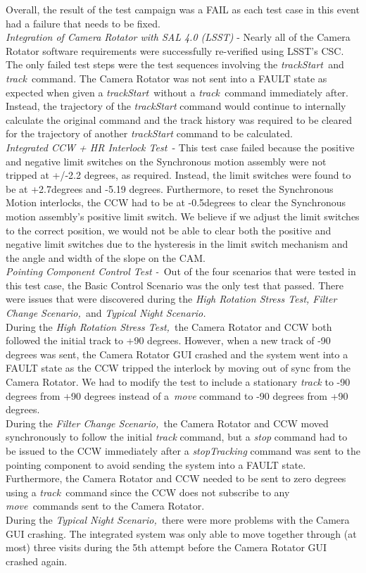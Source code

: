 \documentclass[SE,lsstdraft,STR,toc]{lsstdoc}
\begin{document}
 Overall, the result of the test campaign was a FAIL as each test case in
this event had a failure that needs to be
fixed.\\[2\baselineskip]\emph{Integration of Camera Rotator with SAL 4.0
(LSST)} - Nearly all of the Camera Rotator software requirements were
successfully re-verified using LSST's CSC. The only failed test steps
were the test sequences involving the \emph{trackStart~}and
\emph{track~}command. The Camera Rotator was not sent into a FAULT state
as expected when given a \emph{trackStart~}without a
\emph{track~}command immediately after. Instead, the trajectory of the
\emph{trackStart} command would continue to internally calculate the
original command and the track history was required to be cleared for
the trajectory of another \emph{trackStart} command to be
calculated.\\[2\baselineskip]\emph{Integrated CCW + HR Interlock Test~}-
This test case failed because the positive and negative limit switches
on the Synchronous motion assembly were not tripped at +/-2.2 degrees,
as required. Instead, the limit switches were found to be at +2.7degrees
and -5.19 degrees. Furthermore, to reset the Synchronous Motion
interlocks, the CCW had to be at -0.5degrees to clear the Synchronous
motion assembly's positive limit switch. We believe if we adjust the
limit switches to the correct position, we would not be able to clear
both the positive and negative limit switches due to the hysteresis in
the limit switch mechanism and the angle and width of the slope on the
CAM.\\[2\baselineskip]\emph{Pointing Component Control Test -~}Out of
the four scenarios that were tested in this test case, the Basic Control
Scenario was the only test that passed. There were issues that were
discovered during the \emph{High Rotation Stress Test, Filter Change
Scenario,~}and \emph{Typical Night Scenario.}\\
During the \emph{High Rotation Stress Test,~}the Camera Rotator and CCW
both followed the initial track to +90 degrees. However, when a new
track of -90 degrees was sent, the Camera Rotator GUI crashed and the
system went into a FAULT state as the CCW tripped the interlock by
moving out of sync from the Camera Rotator. We had to modify the test to
include a stationary \emph{track} to -90 degrees from +90 degrees
instead of a~\emph{move} command to -90 degrees from +90 degrees.\\
During the \emph{Filter Change Scenario,~}the Camera Rotator and CCW
moved synchronously to follow the initial \emph{track} command, but a
\emph{stop} command had to be issued to the CCW immediately after a
\emph{stopTracking} command was sent to the pointing component to avoid
sending the system into a FAULT state. Furthermore, the Camera Rotator
and CCW needed to be sent to zero degrees using a \emph{track~}command
since the CCW does not subscribe to any \emph{move~}commands sent to the
Camera Rotator.\\
During the \emph{Typical Night Scenario,~}there were more problems with
the Camera GUI crashing. The integrated system was only able to move
together through (at most) three visits during the 5th attempt before
the Camera Rotator GUI crashed again.~
\end{document}
